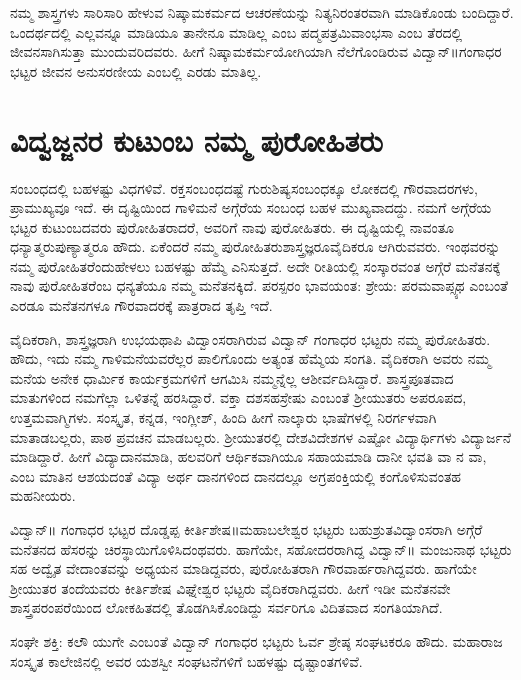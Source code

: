{ನಮ್ಮ ಶಾಸ್ತ್ರಗಳು ಸಾರಿ\enginline{-}ಸಾರಿ ಹೇಳುವ ನಿಷ್ಕಾಮಕರ್ಮದ ಆಚರಣೆಯನ್ನು ನಿತ್ಯ\enginline{-}ನಿರಂತರವಾಗಿ ಮಾಡಿಕೊಂಡು ಬಂದಿದ್ದಾರೆ. ಒಂದರ್ಥದಲ್ಲಿ ಎಲ್ಲವನ್ನೂ ಮಾಡಿಯೂ ತಾನೇನೂ ಮಾಡಿಲ್ಲ ಎಂಬ ಪದ್ಮಪತ್ರಮಿವಾಂಭಸಾ ಎಂಬ ತೆರದಲ್ಲಿ ಜೀವನಸಾಗಿಸುತ್ತಾ ಮುಂದುವರಿದವರು. ಹೀಗೆ ನಿಷ್ಕಾಮಕರ್ಮಯೋಗಿಯಾಗಿ ನೆಲೆಗೊಂಡಿರುವ ವಿದ್ವಾನ್॥ಗಂಗಾಧರ ಭಟ್ಟರ ಜೀವನ ಅನುಸರಣೀಯ ಎಂಬಲ್ಲಿ ಎರಡು ಮಾತಿಲ್ಲ.

\section*{ವಿದ್ವಜ್ಜನರ ಕುಟುಂಬ   \enginline{-}   ನಮ್ಮ ಪುರೋಹಿತರು}

ಸಂಬಂಧದಲ್ಲಿ ಬಹಳಷ್ಟು ವಿಧಗಳಿವೆ. ರಕ್ತಸಂಬಂಧದಷ್ಟೆ ಗುರು\enginline{-}ಶಿಷ್ಯಸಂಬಂಧಕ್ಕೂ ಲೋಕದಲ್ಲಿ ಗೌರವಾದರಗಳು, ಪ್ರಾಮುಖ್ಯವೂ ಇದೆ. ಈ ದೃಷ್ಟಿಯಿಂದ ಗಾಳಿಮನೆ  \enginline{-}  ಅಗ್ಗೆರೆಯ ಸಂಬಂಧ ಬಹಳ ಮುಖ್ಯವಾದದ್ದು.  ನಮಗೆ ಅಗ್ಗೆರೆಯ ಭಟ್ಟರ ಕುಟುಂಬ\-ದವರು ಪುರೋಹಿತರಾದರೆ, ಅವರಿಗೆ ನಾವು ಪುರೋಹಿತರು. ಈ ದೃಷ್ಟಿಯಲ್ಲಿ ನಾವಂತೂ ಧನ್ಯಾತ್ಮರು\enginline{-}ಪುಣ್ಯಾತ್ಮರೂ ಹೌದು. ಏಕೆಂದರೆ ನಮ್ಮ ಪುರೋಹಿತರು\break ಶಾಸ್ತ್ರಜ್ಞರೂ\enginline{-}ವೈದಿಕರೂ ಆಗಿರುವವರು. ಇಂಥವರನ್ನು ನಮ್ಮ ಪುರೋಹಿತರೆಂದು\break ಹೇಳಲು ಬಹಳಷ್ಟು ಹೆಮ್ಮೆ ಎನಿಸುತ್ತದೆ. ಅದೇ ರೀತಿಯಲ್ಲಿ ಸಂಸ್ಕಾರವಂತ  \enginline{-}   ಅಗ್ಗೆರೆ ಮನೆತನಕ್ಕೆ ನಾವು ಪುರೋಹಿತರೆಂಬ ಧನ್ಯತೆಯೂ ನಮ್ಮ ಮನೆತನಕ್ಕಿದೆ. ಪರಸ್ಪರಂ ಭಾವಯಂತ: ಶ್ರೇಯ: ಪರಮವಾಪ್ಸ್ಯಥ  ಎಂಬಂತೆ ಎರಡೂ ಮನೆತನಗಳೂ ಗೌರವಾದರಕ್ಕೆ ಪಾತ್ರರಾದ ತೃಪ್ತಿ ಇದೆ. 

ವೈದಿಕರಾಗಿ, ಶಾಸ್ತ್ರಜ್ಞರಾಗಿ ಉಭಯಥಾಪಿ ವಿದ್ವಾಂಸರಾಗಿರುವ ವಿದ್ವಾನ್ \hbox{ಗಂಗಾಧರ} ಭಟ್ಟರು ನಮ್ಮ ಪುರೋಹಿತರು. ಹೌದು, ಇದು ನಮ್ಮ ಗಾಳಿಮನೆಯವರೆಲ್ಲರ ಪಾಲಿಗೊಂದು ಅತ್ಯಂತ ಹೆಮ್ಮೆಯ ಸಂಗತಿ. ವೈದಿಕರಾಗಿ ಅವರು ನಮ್ಮ ಮನೆಯ ಅನೇಕ ಧಾರ್ಮಿಕ ಕಾರ್ಯಕ್ರಮಗಳಿಗೆ ಆಗಮಿಸಿ ನಮ್ಮನ್ನೆಲ್ಲ ಆಶೀರ್ವದಿಸಿದ್ದಾರೆ. ಶಾಸ್ತ್ರಪೂತವಾದ ಮಾತುಗಳಿಂದ ನಮಗೆಲ್ಲಾ ಒಳಿತನ್ನೆ ಹರಸಿದ್ದಾರೆ. ವಕ್ತಾ ದಶಸಹಸ್ರೇಷು ಎಂಬಂತೆ ಶ್ರೀಯುತರು ಅಪರೂಪದ, ಉತ್ತಮವಾಗ್ಮಿಗಳು. ಸಂಸ್ಕೃತ, ಕನ್ನಡ, ಇಂಗ್ಲೀಶ್, ಹಿಂದಿ ಹೀಗೆ ನಾಲ್ಕಾರು ಭಾಷೆಗಳಲ್ಲಿ ನಿರರ್ಗಳವಾಗಿ ಮಾತಾಡಬಲ್ಲರು, ಪಾಠ \enginline{-}ಪ್ರವಚನ ಮಾಡಬಲ್ಲರು. ಶ್ರೀಯುತರಲ್ಲಿ ದೇಶ\enginline{-}ವಿದೇಶಗಳ ಎಷ್ಟೋ ವಿದ್ಯಾರ್ಥಿಗಳು ವಿದ್ಯಾರ್ಜನೆ ಮಾಡಿದ್ದಾರೆ. ಹೀಗೆ ವಿದ್ಯಾದಾನಮಾಡಿ, ಹಲವರಿಗೆ ಆರ್ಥಿಕವಾಗಿಯೂ ಸಹಾಯಮಾಡಿ ದಾನೀ ಭವತಿ ವಾ ನ ವಾ,  ಎಂಬ ಮಾತಿನ ಆಶಯದಂತೆ ವಿದ್ಯಾ  \enginline{-}  ಅರ್ಥ ದಾನಗಳಿಂದ ದಾನದಲ್ಲೂ ಅಗ್ರಪಂಕ್ತಿಯಲ್ಲಿ ಕಂಗೊಳಿಸುವಂತಹ ಮಹನೀಯರು. 

ವಿದ್ವಾನ್॥ ಗಂಗಾಧರ ಭಟ್ಟರ ದೊಡ್ಡಪ್ಪ ಕೀರ್ತಿಶೇಷ॥ಮಹಾಬಲೇಶ್ವರ ಭಟ್ಟರು ಬಹುಶ್ರುತವಿದ್ವಾಂಸರಾಗಿ ಅಗ್ಗೆರೆ ಮನೆತನದ ಹೆಸರನ್ನು ಚಿರಸ್ಥಾಯಿಗೊಳಿಸಿದಂಥವರು. ಹಾಗೆಯೇ, ಸಹೋದರರಾಗಿದ್ದ ವಿದ್ವಾನ್॥ ಮಂಜುನಾಥ ಭಟ್ಟರು ಸಹ ಅದ್ವೈತ ವೇದಾಂತವನ್ನು ಅಧ್ಯಯನ ಮಾಡಿದ್ದವರು, ಪುರೋಹಿತರಾಗಿ ಗೌರವಾರ್ಹರಾಗಿ\-ದ್ದವರು. ಹಾಗೆಯೇ ಶ್ರೀಯುತರ ತಂದೆಯವರು ಕೀರ್ತಿಶೇಷ ವಿಘ್ನೇಶ್ವರ ಭಟ್ಟರು ವೈದಿಕ\-ರಾಗಿದ್ದವರು. ಹೀಗೆ ಇಡೀ ಮನೆತನವೇ ಶಾಸ್ತ್ರಪರಂಪರೆಯಿಂದ ಲೋಕಹಿತದಲ್ಲಿ ತೊಡಗಿಸಿಕೊಂಡಿದ್ದು ಸರ್ವರಿಗೂ ವಿದಿತವಾದ ಸಂಗತಿಯಾಗಿದೆ. 

ಸಂಘೇ ಶಕ್ತಿ: ಕಲೌ ಯುಗೇ ಎಂಬಂತೆ ವಿದ್ವಾನ್ ಗಂಗಾಧರ ಭಟ್ಟರು ಓರ್ವ ಶ್ರೇಷ್ಠ ಸಂಘಟಕರೂ ಹೌದು. ಮಹಾರಾಜ ಸಂಸ್ಕೃತ ಕಾಲೇಜಿನಲ್ಲಿ ಅವರ ಯಶಸ್ವೀ ಸಂಘಟನೆಗಳಿಗೆ ಬಹಳಷ್ಟು ದೃಷ್ಟಾಂತಗಳಿವೆ. 

}
